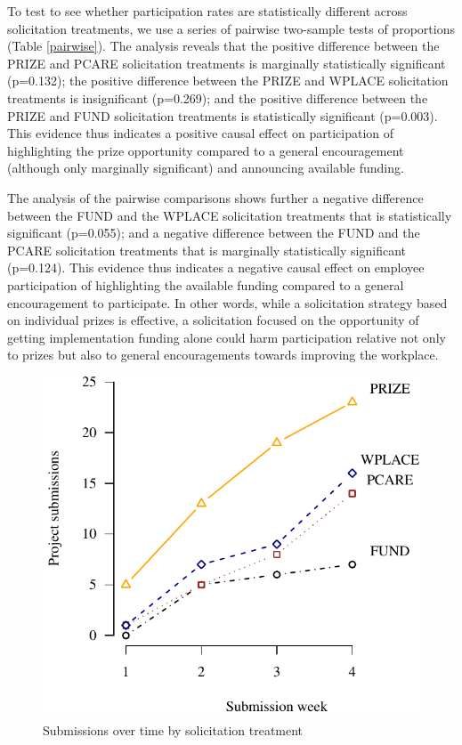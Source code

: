 \documentclass[12pt, titlepage]{article}
\begin{document}
To test to see whether participation rates are statistically different
across solicitation treatments, we use a series of pairwise two-sample
tests of proportions (Table \ref{pairwise}). The analysis reveals that
the positive difference between the PRIZE and PCARE solicitation
treatments is marginally statistically significant (p=0.132); the
positive difference between the PRIZE and WPLACE solicitation treatments
is insignificant (p=0.269); and the positive difference between the
PRIZE and FUND solicitation treatments is statistically significant
(p=0.003). This evidence thus indicates a positive causal effect on
participation of highlighting the prize opportunity compared to a
general encouragement (although only marginally significant) and
announcing available funding.

The analysis of the pairwise comparisons shows further a negative
difference between the FUND and the WPLACE solicitation treatments that
is statistically significant (p=0.055); and a negative difference
between the FUND and the PCARE solicitation treatments that is
marginally statistically significant (p=0.124). This evidence thus
indicates a negative causal effect on employee participation of
highlighting the available funding compared to a general encouragement
to participate. In other words, while a solicitation strategy based on
individual prizes is effective, a solicitation focused on the
opportunity of getting implementation funding alone could harm
participation relative not only to prizes but also to general
encouragements towards improving the workplace.

\begin{figure}
\caption{Submissions over time by solicitation treatment}
\label{figure_dynamics}\centering
\includegraphics{figures/figure_dynamics-1.pdf}
\end{figure}
\end{document}
